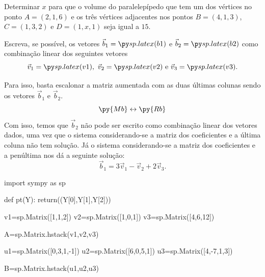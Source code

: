 \question 	Determinar $x$ para que o volume do paralelepípedo que tem um dos vértices no ponto $A=(2,1,6)$ e os três vértices adjacentes nos pontos $B=(4,1,3)$, $C=(1,3,2)$ e $D=(1,x,1)$ seja igual a $15$.



\question Escreva, se possível,  os vetores {\(\vec{b}_1=\pyl{b1}\)} e {\(\vec{b}_2=\pyl{b2}\)} como combinação linear dos seguintes vetores
\[
\vec{v}_1=\pyl{v1},\ \vec{v}_2=\pyl{v2} \text{ e } \vec{v}_3=\pyl{v3}.
\]

\begin{solution}
Para isso, basta escalonar a matriz aumentada com as duas últimas colunas sendo os vetores \(\vec{b}_1\) e \(\vec{b}_2\).
\begin{equation*}
\py{Mb}\leftrightarrow \py{Rb}
\end{equation*}
Com isso, temos que \(\vec{b}_2\) não pode ser escrito como combinação linear dos vetores dados, uma vez que o sistema considerando-se a matriz dos coeficientes e a última coluna não tem solução. Já o sistema considerando-se a matriz dos coeficientes e a penúltima  nos dá a seguinte solução:
\[\vec{b}_1=3\vec{v}_1-\vec{v}_2+2\vec{v}_3.\]

\end{solution}


\begin{pycode}
import sympy as sp

def pt(Y):
 return((Y[0],Y[1],Y[2]))

v1=sp.Matrix([1,1,2])
v2=sp.Matrix([1,0,1])
v3=sp.Matrix([4,6,12])

A=sp.Matrix.hstack(v1,v2,v3)


u1=sp.Matrix([0,3,1,-1])
u2=sp.Matrix([6,0,5,1])
u3=sp.Matrix([4,-7,1,3])

B=sp.Matrix.hstack(u1,u2,u3)
\end{pycode}


